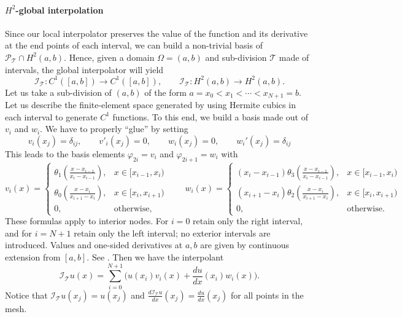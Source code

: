 \paragraph{$H^2$-global interpolation}
Since our local interpolator preserves the value of the function and its derivative at the end points of each interval, we can build a non-trivial basis of $\mathcal P_{\mathcal T} \cap H^2(a,b)$.
Hence, given a domain $\Omega = (a,b)$ and sub-division $\mathcal T$ made of intervals, the global interpolator will yield
$$
    \mathcal I_{\mathcal T} : C^1( [a,b] ) \to C^1([a,b]), \qquad \mathcal I_{\mathcal T} : H^2(a,b) \to H^2(a,b).
$$
Let us take a sub-division of $(a,b)$ of the form $a = x_0 < x_1 < \cdots < x_{N+1} = b$. Let us describe the finite-element space generated by using Hermite cubics in each interval to generate $C^1$ functions. To this end, we build a basis made out of $v_i$ and $w_i$.
We have to properly ``glue'' by setting
$$
    v_{i}(x_j) = \delta_{ij}, \qquad v'_i (x_j) = 0, \qquad w_i (x_j) = 0, \qquad w_i'(x_j) = \delta_{ij}
$$
This leads to the basis elements $\varphi_{2i} = v_i$ and $\varphi_{2i + 1} = w_i$ with
$$
    v_{i} (x) =
    \begin{cases}
        \theta_1 \left( \frac{x-x_{i-1}}{x_{i}-x_{i-1}} \right) , & x \in [x_{i-1},x_{i}) \\
        \theta_0 (\frac{x-x_{i}}{x_{i+1}-x_{i}}) ,                & x \in [x_{i},x_{i+1}) \\
        0,                                                        & \text{otherwise},
    \end{cases}
    \qquad
    w_{i} (x) =
    \begin{cases}
        (x_{i}-x_{i-1}) \theta_3 \left( \frac{x-x_{i-1}}{x_{i}-x_{i-1}} \right) , & x \in [x_{i-1},x_{i}) \\
        (x_{i+1}-x_{i}) \theta_2 (\frac{x-x_{i}}{x_{i+1}-x_{i}}) ,                & x \in [x_{i},x_{i+1}) \\
        0,                                                                        & \text{otherwise}.
    \end{cases}
$$
These formulas apply to interior nodes. For $i=0$ retain only the right interval, and for $i=N+1$ retain only the left interval; no exterior intervals are introduced. Values and one-sided derivatives at $a,b$ are given by continuous extension from $[a,b]$. See .
Then we have the interpolant
\begin{equation*}
    \mathcal I_{\mathcal T} u(x) = \sum_{i=0}^{N+1} \Big( u(x_i) v_i(x) + \frac{du}{dx}(x_i) w_i (x)\Big).
\end{equation*}
Notice that $\mathcal I_{\mathcal T} u(x_j) = u(x_j)$ and $\frac{d \mathcal I_{\mathcal T} u}{dx} (x_j) = \frac{du}{dx}(x_j)$ for all points in the mesh.


